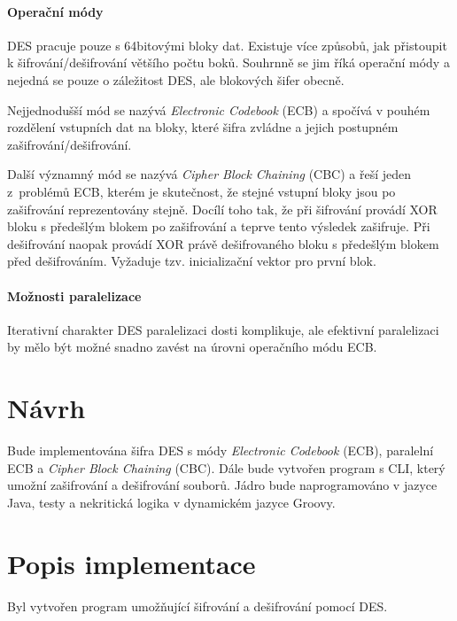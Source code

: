 \documentclass[12pt, a4paper]{article}
\begin{document}
\paragraph{Operační módy}
DES pracuje pouze s 64bitovými bloky dat.
Existuje více způsobů, jak přistoupit k šifrování/dešifrování většího počtu boků.
Souhrnně se jim říká operační módy a nejedná se pouze o záležitost DES, ale blokových šifer obecně.

Nejjednodušší mód se nazývá \emph{Electronic Codebook} (ECB) a spočívá v pouhém rozdělení vstupních dat na bloky, které šifra zvládne a jejich postupném zašifrování/dešifrování.

Další významný mód se nazývá \emph{Cipher Block Chaining} (CBC) a řeší jeden z~problémů ECB, kterém je skutečnost, že stejné vstupní bloky jsou po zašifrování reprezentovány stejně.
Docílí toho tak, že při šifrování provádí XOR bloku s předešlým blokem po zašifrování a teprve tento výsledek zašifruje.
Při dešifrování naopak provádí XOR právě dešifrovaného bloku s předešlým blokem před dešifrováním.
Vyžaduje tzv. inicializační vektor pro první blok.

\paragraph{Možnosti paralelizace} 
Iterativní charakter DES paralelizaci dosti komplikuje, ale efektivní paralelizaci by mělo být možné snadno zavést na úrovni operačního módu ECB.

\section{Návrh}
Bude implementována šifra DES s módy \emph{Electronic Codebook} (ECB), paralelní ECB a \emph{Cipher Block Chaining} (CBC).
Dále bude vytvořen program s CLI, který umožní zašifrování a dešifrování souborů.
Jádro bude naprogramováno v jazyce Java, testy a nekritická logika v dynamickém jazyce Groovy.

\section{Popis implementace}
Byl vytvořen program umožňující šifrování a dešifrování pomocí DES.
\end{document}
